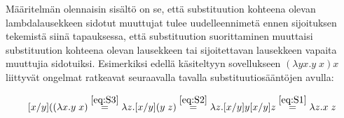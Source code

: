 Määritelmän olennaisin sisältö on se, että substituution kohteena olevan lambdalausekkeen sidotut muuttujat tulee uudelleennimetä ennen sijoituksen tekemistä siinä tapauksessa, että substituution suorittaminen muuttaisi substituution kohteena olevan lausekkeen tai sijoitettavan lausekkeen vapaita muuttujia sidotuiksi. Esimerkiksi edellä käsiteltyyn sovellukseen $(\lambda yx . y \; x) x$ liittyvät ongelmat ratkeavat seuraavalla tavalla substituutiosääntöjen avulla:

\[ [ x / y]((\lambda x . y \; x)  \stackrel{\eqref{eq:S3}}{=} \\ 
	\lambda z . [ x / y](y \; z) \stackrel{\eqref{eq:S2}}{=} \\
	\lambda z . [ x / y]y [ x / y]z \stackrel{\eqref{eq:S1}}{=} \lambda z . x \; z	
\]   

